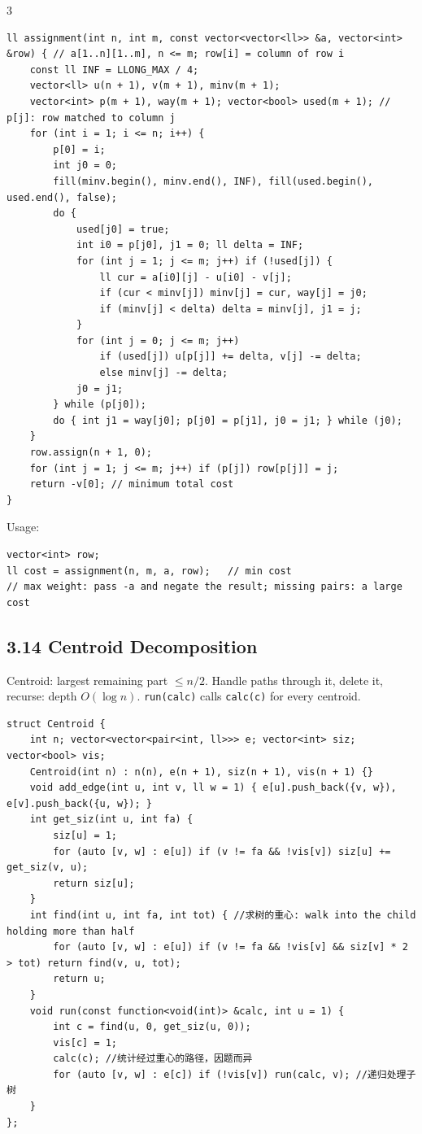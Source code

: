 \documentclass[8pt]{extarticle}
\begin{document}
\begin{multicols*}{3}
\begin{lstlisting}
ll assignment(int n, int m, const vector<vector<ll>> &a, vector<int> &row) { // a[1..n][1..m], n <= m; row[i] = column of row i
    const ll INF = LLONG_MAX / 4;
    vector<ll> u(n + 1), v(m + 1), minv(m + 1);
    vector<int> p(m + 1), way(m + 1); vector<bool> used(m + 1); // p[j]: row matched to column j
    for (int i = 1; i <= n; i++) {
        p[0] = i;
        int j0 = 0;
        fill(minv.begin(), minv.end(), INF), fill(used.begin(), used.end(), false);
        do {
            used[j0] = true;
            int i0 = p[j0], j1 = 0; ll delta = INF;
            for (int j = 1; j <= m; j++) if (!used[j]) {
                ll cur = a[i0][j] - u[i0] - v[j];
                if (cur < minv[j]) minv[j] = cur, way[j] = j0;
                if (minv[j] < delta) delta = minv[j], j1 = j;
            }
            for (int j = 0; j <= m; j++)
                if (used[j]) u[p[j]] += delta, v[j] -= delta;
                else minv[j] -= delta;
            j0 = j1;
        } while (p[j0]);
        do { int j1 = way[j0]; p[j0] = p[j1], j0 = j1; } while (j0);
    }
    row.assign(n + 1, 0);
    for (int j = 1; j <= m; j++) if (p[j]) row[p[j]] = j;
    return -v[0]; // minimum total cost
}
\end{lstlisting}

Usage:

\begin{lstlisting}
vector<int> row;
ll cost = assignment(n, m, a, row);   // min cost
// max weight: pass -a and negate the result; missing pairs: a large cost
\end{lstlisting}

\subsection*{3.14 Centroid Decomposition}

Centroid: largest remaining part $\le n/2$. Handle paths through it, delete it, recurse: depth $O(\log n)$. \texttt{run(calc)} calls \texttt{calc(c)} for every centroid.

\begin{lstlisting}
struct Centroid {
    int n; vector<vector<pair<int, ll>>> e; vector<int> siz; vector<bool> vis;
    Centroid(int n) : n(n), e(n + 1), siz(n + 1), vis(n + 1) {}
    void add_edge(int u, int v, ll w = 1) { e[u].push_back({v, w}), e[v].push_back({u, w}); }
    int get_siz(int u, int fa) {
        siz[u] = 1;
        for (auto [v, w] : e[u]) if (v != fa && !vis[v]) siz[u] += get_siz(v, u);
        return siz[u];
    }
    int find(int u, int fa, int tot) { //求树的重心: walk into the child holding more than half
        for (auto [v, w] : e[u]) if (v != fa && !vis[v] && siz[v] * 2 > tot) return find(v, u, tot);
        return u;
    }
    void run(const function<void(int)> &calc, int u = 1) {
        int c = find(u, 0, get_siz(u, 0));
        vis[c] = 1;
        calc(c); //统计经过重心的路径，因题而异
        for (auto [v, w] : e[c]) if (!vis[v]) run(calc, v); //递归处理子树
    }
};
\end{lstlisting}


\end{multicols*}
\end{document}
